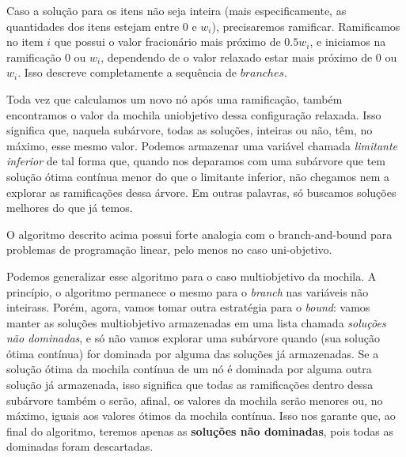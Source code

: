 Caso a solução para os itens não seja inteira (mais especificamente, as quantidades dos itens estejam entre $0$ e $w_i$), precisaremos ramificar. Ramificamos no item $i$ que possui o valor fracionário mais próximo de $0.5w_i$, e iniciamos na ramificação $0$ ou $w_i$, dependendo de o valor relaxado estar mais próximo de  $0$ ou $w_i$. Isso descreve completamente a sequência de $branches$.

Toda vez que calculamos um novo nó após uma ramificação, também encontramos o valor da mochila uniobjetivo dessa configuração relaxada. Isso significa que, naquela subárvore, todas as soluções, inteiras ou não, têm, no máximo, esse mesmo valor. Podemos armazenar uma variável chamada \textit{limitante inferior} de tal forma que, quando nos deparamos com uma subárvore que tem solução ótima contínua menor do que o limitante inferior, não chegamos nem a explorar as ramificações dessa árvore. Em outras palavras, só buscamos soluções melhores do que já temos.

O algoritmo descrito acima possui forte analogia com o branch-and-bound para problemas de programação linear, pelo menos no caso uni-objetivo.

Podemos generalizar esse algoritmo para o caso multiobjetivo da mochila. A princípio, o algoritmo permanece o mesmo para o \textit{branch} nas variáveis não inteirass. Porém, agora, vamos tomar outra estratégia para o \textit{bound}: vamos manter as soluções multiobjetivo armazenadas em uma lista chamada \textit{soluções não dominadas}, e só não vamos explorar uma subárvore quando (sua solução ótima contínua) for dominada por alguma das soluções já armazenadas. Se a solução ótima da mochila contínua de um nó é dominada por alguma outra solução já armazenada, isso significa que todas as ramificações dentro dessa subárvore também o serão, afinal, os valores da mochila serão menores ou, no máximo, iguais aos valores ótimos da mochila contínua. Isso nos garante que, ao final do algoritmo, teremos apenas as \textbf{soluções não dominadas}, pois todas as dominadas foram descartadas.
